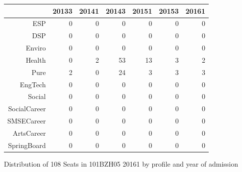 \documentclass{article}\usepackage[]{graphicx}\usepackage[]{color}
\makeatletter
\newenvironment{kframe}{%
 \def\at@end@of@kframe{}%
 \ifinner\ifhmode%
  \def\at@end@of@kframe{\end{minipage}}%
  \begin{minipage}{\columnwidth}%
 \fi\fi%
 \def\FrameCommand##1{\hskip\@totalleftmargin \hskip-\fboxsep
 \colorbox{shadecolor}{##1}\hskip-\fboxsep
     \hskip-\linewidth \hskip-\@totalleftmargin \hskip\columnwidth}%
 \MakeFramed {\advance\hsize-\width
   \@totalleftmargin\z@ \linewidth\hsize
   \@setminipage}}%
 {\par\unskip\endMakeFramed%
 \at@end@of@kframe}
\makeatother
\begin{document}
\begin{figure}[H]
\centering
\begin{tabular}{rrrrrrr}
  \hline
 & 20133 & 20141 & 20143 & 20151 & 20153 & 20161 \\ 
  \hline
ESP &   0 &   0 &   0 &   0 &   0 &   0 \\ 
  DSP &   0 &   0 &   0 &   0 &   0 &   0 \\ 
  Enviro &   0 &   0 &   0 &   0 &   0 &   0 \\ 
  Health &   0 &   2 &  53 &  13 &   3 &   2 \\ 
  Pure &   2 &   0 &  24 &   3 &   3 &   3 \\ 
  EngTech &   0 &   0 &   0 &   0 &   0 &   0 \\ 
  Social &   0 &   0 &   0 &   0 &   0 &   0 \\ 
  SocialCareer &   0 &   0 &   0 &   0 &   0 &   0 \\ 
  SMSECareer &   0 &   0 &   0 &   0 &   0 &   0 \\ 
  ArtsCareer &   0 &   0 &   0 &   0 &   0 &   0 \\ 
  SpringBoard &   0 &   0 &   0 &   0 &   0 &   0 \\ 
   \hline
\end{tabular}
\caption{Distribution of 108 Seats in 101BZH05 20161 by profile and year of admission} 
\end{figure}
\begin{kframe}

{\ttfamily\noindent\bfseries\color{errorcolor}{\#\# Error in characters | factors: operations are possible only for numeric, logical or complex types}}\end{kframe}
\end{document}
